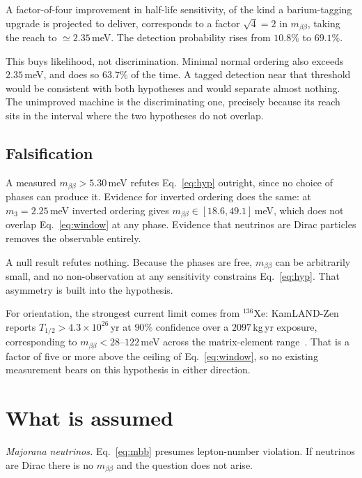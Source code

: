 \documentclass[aps,prd,twocolumn,superscriptaddress,nofootinbib,10pt]{revtex4-2}
\begin{document}
A factor-of-four improvement in half-life sensitivity, of the kind a barium-tagging upgrade is
projected to deliver, corresponds to a factor $\sqrt{4} = 2$ in $m_{\beta\beta}$, taking the reach
to $\simeq 2.35\,$meV. The detection probability rises from $10.8\%$ to $69.1\%$.

This buys likelihood, not discrimination. Minimal normal ordering also exceeds $2.35\,$meV, and
does so $63.7\%$ of the time. A tagged detection near that threshold would be consistent with both
hypotheses and would separate almost nothing. The unimproved machine is the discriminating one,
precisely because its reach sits in the interval where the two hypotheses do not overlap.

\subsection{Falsification}

A measured $m_{\beta\beta} > 5.30\,$meV refutes Eq.~\eqref{eq:hyp} outright, since no choice of
phases can produce it. Evidence for inverted ordering does the same: at $m_3 = 2.25\,$meV inverted
ordering gives $m_{\beta\beta} \in [18.6, 49.1]\,$meV, which does not overlap
Eq.~\eqref{eq:window} at any phase. Evidence that neutrinos are Dirac particles removes the
observable entirely.

A null result refutes nothing. Because the phases are free, $m_{\beta\beta}$ can be arbitrarily
small, and no non-observation at any sensitivity constrains Eq.~\eqref{eq:hyp}. That asymmetry is
built into the hypothesis.

For orientation, the strongest current limit comes from $^{136}$Xe: KamLAND-Zen reports
$T_{1/2} > 4.3 \times 10^{26}\,$yr at $90\%$ confidence over a $2097\,$kg\,yr exposure,
corresponding to $m_{\beta\beta} < 28$--$122\,$meV across the matrix-element
range~\cite{KamLANDZen2023}. That is a factor of five or more above the ceiling of
Eq.~\eqref{eq:window}, so no existing measurement bears on this hypothesis in either direction.

\section{What is assumed}\label{sec:assume}

\emph{Majorana neutrinos.} Eq.~\eqref{eq:mbb} presumes lepton-number violation. If neutrinos are
Dirac there is no $m_{\beta\beta}$ and the question does not arise.
\end{document}
